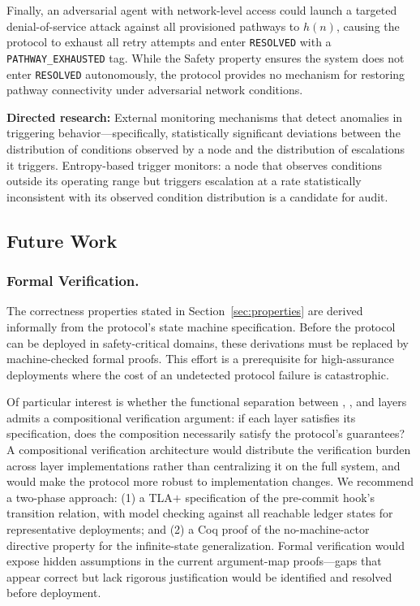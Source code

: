 Finally, an adversarial agent with network-level access could launch a targeted denial-of-service attack against all provisioned pathways to $h(n)$, causing the protocol to exhaust all retry attempts and enter \texttt{RESOLVED} with a \texttt{PATHWAY\_EXHAUSTED} tag. While the Safety property ensures the system does not enter \texttt{RESOLVED} autonomously, the protocol provides no mechanism for restoring pathway connectivity under adversarial network conditions.

\medskip\noindent\textbf{Directed research:} External monitoring mechanisms that detect anomalies in triggering behavior---specifically, statistically significant deviations between the distribution of conditions observed by a node and the distribution of escalations it triggers. Entropy-based trigger monitors: a node that observes conditions outside its operating range but triggers escalation at a rate statistically inconsistent with its observed condition distribution is a candidate for audit.

\subsection{Future Work}

\subsubsection{Formal Verification.}
The correctness properties stated in Section~\ref{sec:properties} are derived informally from the protocol's state machine specification. Before the protocol can be deployed in safety-critical domains, these derivations must be replaced by machine-checked formal proofs. This effort is a prerequisite for high-assurance deployments where the cost of an undetected protocol failure is catastrophic.

Of particular interest is whether the functional separation between \purpose{}, \bounds{}, and \fact{} layers admits a compositional verification argument: if each layer satisfies its specification, does the composition necessarily satisfy the protocol's guarantees? A compositional verification architecture would distribute the verification burden across layer implementations rather than centralizing it on the full system, and would make the protocol more robust to implementation changes. We recommend a two-phase approach: (1) a TLA$+$ specification of the pre-commit hook's transition relation, with model checking against all reachable ledger states for representative deployments; and (2) a Coq proof of the no-machine-actor directive property for the infinite-state generalization. Formal verification would expose hidden assumptions in the current argument-map proofs---gaps that appear correct but lack rigorous justification would be identified and resolved before deployment.

